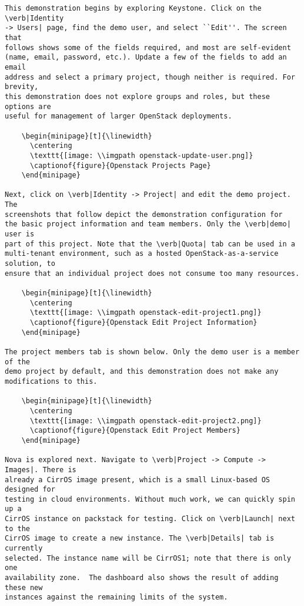\begin{verbatim}
This demonstration begins by exploring Keystone. Click on the \verb|Identity
-> Users| page, find the demo user, and select ``Edit''. The screen that
follows shows some of the fields required, and most are self-evident
(name, email, password, etc.). Update a few of the fields to add an email
address and select a primary project, though neither is required. For brevity,
this demonstration does not explore groups and roles, but these options are
useful for management of larger OpenStack deployments.

    \begin{minipage}[t]{\linewidth}
	  \centering
      \texttt{[image: \\imgpath openstack-update-user.png]}
      \captionof{figure}{Openstack Projects Page}
    \end{minipage}

Next, click on \verb|Identity -> Project| and edit the demo project. The
screenshots that follow depict the demonstration configuration for
the basic project information and team members. Only the \verb|demo| user is
part of this project. Note that the \verb|Quota| tab can be used in a
multi-tenant environment, such as a hosted OpenStack-as-a-service solution, to
ensure that an individual project does not consume too many resources.

    \begin{minipage}[t]{\linewidth}
	  \centering
      \texttt{[image: \\imgpath openstack-edit-project1.png]}
      \captionof{figure}{Openstack Edit Project Information}
    \end{minipage}

The project members tab is shown below. Only the demo user is a member of the
demo project by default, and this demonstration does not make any
modifications to this.

    \begin{minipage}[t]{\linewidth}
	  \centering
      \texttt{[image: \\imgpath openstack-edit-project2.png]}
      \captionof{figure}{Openstack Edit Project Members}
    \end{minipage}

Nova is explored next. Navigate to \verb|Project -> Compute -> Images|. There is
already a CirrOS image present, which is a small Linux-based OS designed for
testing in cloud environments. Without much work, we can quickly spin up a
CirrOS instance on packstack for testing. Click on \verb|Launch| next to the
CirrOS image to create a new instance. The \verb|Details| tab is currently
selected. The instance name will be CirrOS1; note that there is only one
availability zone.  The dashboard also shows the result of adding these new
instances against the remaining limits of the system.


\end{verbatim}
